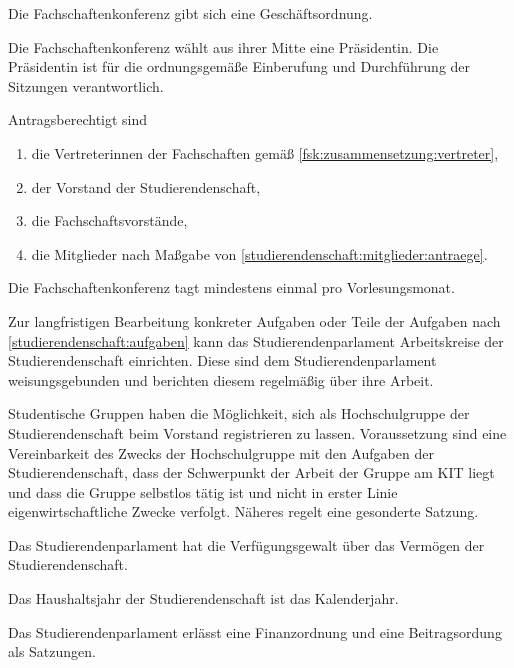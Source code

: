 \begin{jurdoc}
Die Fachschaftenkonferenz gibt sich eine Geschäftsordnung.

Die Fachschaftenkonferenz wählt aus ihrer Mitte eine Präsidentin. Die Präsidentin ist für die ordnungsgemäße Einberufung und Durchführung der Sitzungen verantwortlich.

Antragsberechtigt sind
  \begin{enumerate}
  \item die Vertreterinnen der Fachschaften gemäß \ref{fsk:zusammensetzung:vertreter},
  \item der Vorstand der Studierendenschaft,
  \item die Fachschaftsvorstände,
  \item die Mitglieder nach Maßgabe von \ref{studierendenschaft:mitglieder:antraege}.
  \end{enumerate}

Die Fachschaftenkonferenz tagt mindestens einmal pro Vorlesungsmonat.

%
%


Zur langfristigen Bearbeitung konkreter Aufgaben oder Teile der Aufgaben nach \ref{studierendenschaft:aufgaben} kann das Studierendenparlament Arbeitskreise der Studierendenschaft einrichten. Diese sind dem Studierendenparlament weisungsgebunden und berichten diesem regelmäßig über ihre Arbeit.

Studentische Gruppen haben die Möglichkeit, sich als Hochschulgruppe der Studierendenschaft beim Vorstand registrieren zu lassen. Voraussetzung sind eine Vereinbarkeit des Zwecks der Hochschulgruppe mit den Aufgaben der Studierendenschaft, dass der Schwerpunkt der Arbeit der Gruppe am KIT liegt und dass die Gruppe selbstlos tätig ist und nicht in erster Linie eigenwirtschaftliche Zwecke verfolgt. Näheres regelt eine gesonderte Satzung.

%
%



Das Studierendenparlament hat die Verfügungsgewalt über das Vermögen der Studierendenschaft.

Das Haushaltsjahr der Studierendenschaft ist das Kalenderjahr.

Das Studierendenparlament erlässt eine Finanzordnung und eine Beitragsordung als Satzungen.


\end{jurdoc}
